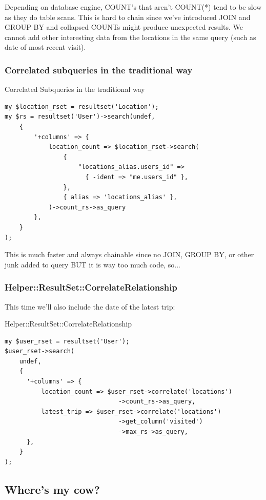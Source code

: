 Depending on database engine, COUNT’s that aren’t COUNT(*) tend to be slow
as they do table scans. 
This is hard to chain since we've introduced JOIN and GROUP BY and collapsed
COUNTs might produce unexpected results. 
We cannot add other interesting data from the locations in the same query
(such as date of most recent visit).

\subsubsection{Correlated subqueries in the traditional way}

\begin{frame}[fragile]{Correlated Subqueries in the traditional way}
\begin{lstlisting}
my $location_rset = resultset('Location');
my $rs = resultset('User')->search(undef,
    {
        '+columns' => {
            location_count => $location_rset->search(
                {
                    "locations_alias.users_id" =>
                      { -ident => "me.users_id" },
                },
                { alias => 'locations_alias' },
            )->count_rs->as_query
        },
    }
);
\end{lstlisting}
\end{frame}

This is much faster and always chainable since no JOIN, GROUP BY, or other junk added to query BUT it is way too much code, so...

\subsubsection{Helper::ResultSet::CorrelateRelationship}

This time we'll also include the date of the latest trip:

\begin{frame}[fragile]{Helper::ResultSet::CorrelateRelationship}
\begin{lstlisting}
my $user_rset = resultset('User');
$user_rset->search(
    undef,
    {
      '+columns' => {
          location_count => $user_rset->correlate('locations')
                               ->count_rs->as_query,
          latest_trip => $user_rset->correlate('locations')
                               ->get_column('visited')
                               ->max_rs->as_query,
      },
    }
);
\end{lstlisting}
\end{frame}


\subsection{Where's my cow?}

